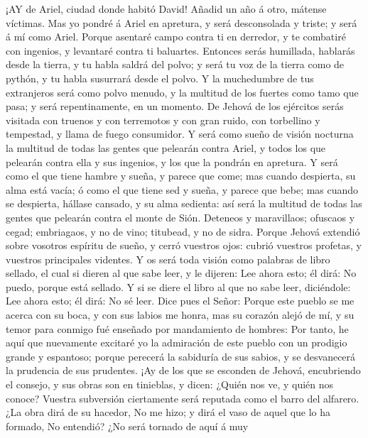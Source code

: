  ¡AY de Ariel, ciudad donde habitó David! Añadid un año á
otro, mátense víctimas.  Mas yo pondré á Ariel en apretura,
y será desconsolada y triste; y será á mí como Ariel. 
Porque asentaré campo contra ti en derredor, y te combatiré con
ingenios, y levantaré contra ti baluartes.  Entonces serás
humillada, hablarás desde la tierra, y tu habla saldrá del polvo; y será
tu voz de la tierra como de pythón, y tu habla susurrará desde el polvo.
 Y la muchedumbre de tus extranjeros será como polvo menudo,
y la multitud de los fuertes como tamo que pasa; y será repentinamente,
en un momento.  De Jehová de los ejércitos serás visitada
con truenos y con terremotos y con gran ruido, con torbellino y
tempestad, y llama de fuego consumidor.  Y será como sueño
de visión nocturna la multitud de todas las gentes que pelearán contra
Ariel, y todos los que pelearán contra ella y sus ingenios, y los que la
pondrán en apretura.  Y será como el que tiene hambre y
sueña, y parece que come; mas cuando despierta, su alma está vacía; ó
como el que tiene sed y sueña, y parece que bebe; mas cuando se
despierta, hállase cansado, y su alma sedienta: así será la multitud de
todas las gentes que pelearán contra el monte de Sión. 
Deteneos y maravillaos; ofuscaos y cegad; embriagaos, y no de vino;
titubead, y no de sidra.  Porque Jehová extendió sobre
vosotros espíritu de sueño, y cerró vuestros ojos: cubrió vuestros
profetas, y vuestros principales videntes.  Y os será toda
visión como palabras de libro sellado, el cual si dieren al que sabe
leer, y le dijeren: Lee ahora esto; él dirá: No puedo, porque está
sellado.  Y si se diere el libro al que no sabe leer,
diciéndole: Lee ahora esto; él dirá: No sé leer.  Dice pues
el Señor: Porque este pueblo se me acerca con su boca, y con sus labios
me honra, mas su corazón alejó de mí, y su temor para conmigo fué
enseñado por mandamiento de hombres:  Por tanto, he aquí
que nuevamente excitaré yo la admiración de este pueblo con un prodigio
grande y espantoso; porque perecerá la sabiduría de sus sabios, y se
desvanecerá la prudencia de sus prudentes.  ¡Ay de los que
se esconden de Jehová, encubriendo el consejo, y sus obras son en
tinieblas, y dicen: ¿Quién nos ve, y quién nos conoce? 
Vuestra subversión ciertamente será reputada como el barro del alfarero.
¿La obra dirá de su hacedor, No me hizo; y dirá el vaso de aquel que lo
ha formado, No entendió?  ¿No será tornado de aquí á muy
